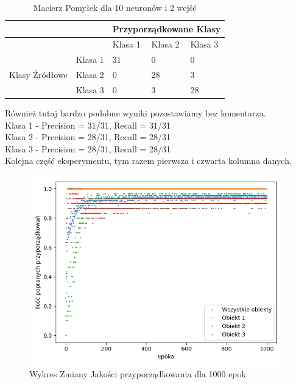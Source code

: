 \documentclass[12pt]{article}
\begin{document}
\newpage
\begin{table}
\caption{\label{tab:tablica11} Macierz Pomyłek dla 10 neuronów i 2 wejść}
\begin{tabular}{ |p{3cm}|p{3cm}|p{2cm}|p{2cm}|p{2cm}|  }
 \hline
 & & 
 \multicolumn{3}{|c|}{Przyporządkowane Klasy} \\
 \hline

   & & Klasa 1 & Klasa 2 & Klasa 3\\
 \hline
\multirow{3}{4em}{Klasy Źródłowe}
   & Klasa 1 & 31 & 0 & 0 \\ 
   & Klasa 2 & 0  & 28 & 3 \\
   & Klasa 3 & 0  & 3   & 28 \\

 \hline
\end{tabular}
\end{table}
Również tutaj bardzo podobne wyniki pozostawiamy bez komentarza.
\\Klasa 1 - Precision = 31/31, Recall = 31/31\\
Klasa 2 - Precision = 28/31, Recall = 28/31\\
Klasa 3 - Precision = 28/31, Recall = 28/31\\
\newpage
Kolejna część eksperymentu, tym razem pierwsza i czwarta kolumna danych.

\begin{figure}[!ht]
 \centering
 \includegraphics[width=11cm]{WykresPrzyporzadkowania10neuron2wejscia3.png}
 \caption{Wykres Zmiany Jakości przyporządkowania dla 1000 epok}
 \vspace{-0.1cm}
 \label{WykresPrzyp13}
\end{figure}

\newpage
\end{document}
